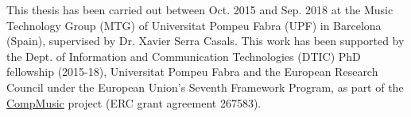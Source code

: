 %
\null
\vfill

{\small \noindent This thesis has been carried out between Oct. 2015 and Sep. 2018 at the Music Technology Group (MTG) of Universitat Pompeu Fabra (UPF) in Barcelona (Spain), supervised by Dr. Xavier Serra Casals. This work has been supported by the Dept. of Information and Communication Technologies (DTIC) PhD fellowship (2015-18), Universitat Pompeu Fabra and the European Research Council under the European Union's Seventh Framework Program, as part of the \href{http://compmusic.upf.edu}{CompMusic} project (ERC grant agreement 267583).\par}
% 
% 
